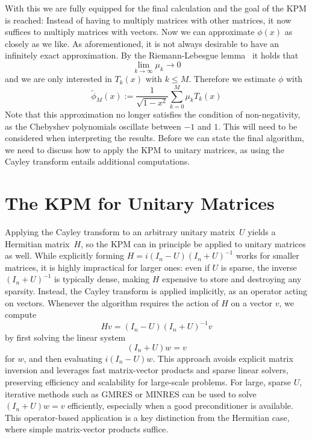 With this we are fully equipped for the final calculation and the goal of the KPM is reached:
Instead of having to multiply matrices with other matrices, it now suffices to multiply matrices with vectors.
Now we can approximate $\phi(x)$ as closely as we like.
As aforementioned, it is not always desirable to have an infinitely exact approximation.
By the Riemann-Lebesgue lemma~\cite[p.~103]{rudin1987} it holds that
\[
\lim \limits_{k \to \infty} \mu_k \to 0
\]
and we are only interested in $T_k(x)$ with $k \leq M$.
Therefore we estimate $\phi$ with
\begin{equation} \label{Approximated spectral density}
    \tilde{\phi}_M(x) := \frac{1}{\sqrt{1 - x^2}} \sum_{k = 0}^{M} \mu_k T_k(x)
\end{equation}
Note that this approximation no longer satisfies the condition of non-negativity, as the Chebyshev polynomials oscillate between $-1$ and $1$. This will need to be considered when interpreting the results. Before we can state the final algorithm, we need to discuss how to apply the KPM to unitary matrices, as using the Cayley transform entails additional computations.

\section{The KPM for Unitary Matrices}
Applying the Cayley transform to an arbitrary unitary matrix~$U$ yields a Hermitian matrix~$H$, so the KPM can in principle be applied to unitary matrices as well. While explicitly forming $H = i(I_n - U)(I_n + U)^{-1}$ works for smaller matrices, it is highly impractical for larger ones: even if $U$ is sparse, the inverse $(I_n + U)^{-1}$ is typically dense, making $H$ expensive to store and destroying any sparsity. Instead, the Cayley transform is applied implicitly, as an operator acting on vectors. Whenever the algorithm requires the action of $H$ on a vector $v$, we compute
\[
    H v = (I_n - U)(I_n + U)^{-1} v
\]
by first solving the linear system
\begin{equation}\label{eq:linear_system}
    (I_n + U) w = v
\end{equation}
for $w$, and then evaluating $i(I_n - U)w$. This approach avoids explicit matrix inversion and leverages fast matrix-vector products and sparse linear solvers, preserving efficiency and scalability for large-scale problems. For large, sparse $U$, iterative methods such as GMRES or MINRES can be used to solve $(I_n + U)w = v$ efficiently, especially when a good preconditioner is available. This operator-based application is a key distinction from the Hermitian case, where simple matrix-vector products suffice.

